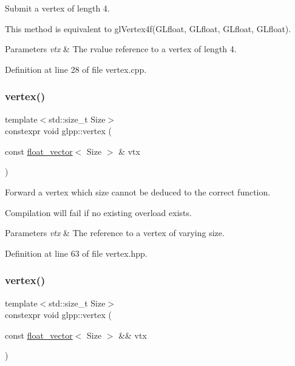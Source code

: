 Submit a vertex of length 4. 

This method is equivalent to gl\+Vertex4f(\+G\+Lfloat, G\+Lfloat, G\+Lfloat, G\+Lfloat).


\begin{DoxyParams}{Parameters}
{\em vtx} & The rvalue reference to a vertex of length 4. \\
\hline
\end{DoxyParams}


Definition at line 28 of file vertex.\+cpp.

\mbox{\label{namespaceglpp_a3ed8b91afc8b1771628e7e370d2a32d4}} 
\subsubsection{\texorpdfstring{vertex()}{vertex()}\hspace{0.1cm}{\footnotesize\ttfamily [7/8]}}
{\footnotesize\ttfamily template$<$std\+::size\+\_\+t Size$>$ \\
constexpr void glpp\+::vertex (\begin{DoxyParamCaption}\item[{const \hyperlink{namespaceglpp_a6c618584338a9ebf15759cea2401f0ae}{float\+\_\+vector}$<$ Size $>$ \&}]{vtx }\end{DoxyParamCaption})\hspace{0.3cm}{\ttfamily [noexcept]}}



Forward a vertex which size cannot be deduced to the correct function. 

Compilation will fail if no existing overload exists.


\begin{DoxyParams}{Parameters}
{\em vtx} & The reference to a vertex of varying size. \\
\hline
\end{DoxyParams}


Definition at line 63 of file vertex.\+hpp.

\mbox{\label{namespaceglpp_ab0794adee60a65b05a53d3ebb884d7bb}} 
\subsubsection{\texorpdfstring{vertex()}{vertex()}\hspace{0.1cm}{\footnotesize\ttfamily [8/8]}}
{\footnotesize\ttfamily template$<$std\+::size\+\_\+t Size$>$ \\
constexpr void glpp\+::vertex (\begin{DoxyParamCaption}\item[{const \hyperlink{namespaceglpp_a6c618584338a9ebf15759cea2401f0ae}{float\+\_\+vector}$<$ Size $>$ \&\&}]{vtx }\end{DoxyParamCaption})\hspace{0.3cm}{\ttfamily [noexcept]}}



